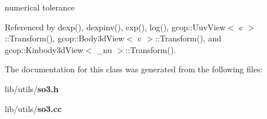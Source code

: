numerical tolerance 



\-Referenced by dexp(), dexpinv(), exp(), log(), gcop\-::\-Uuv\-View$<$ c $>$\-::\-Transform(), gcop\-::\-Body3d\-View$<$ c $>$\-::\-Transform(), and gcop\-::\-Kinbody3d\-View$<$ \-\_\-nu $>$\-::\-Transform().



\-The documentation for this class was generated from the following files\-:\begin{DoxyCompactItemize}
\item 
lib/utils/{\bf so3.\-h}\item 
lib/utils/{\bf so3.\-cc}\end{DoxyCompactItemize}
